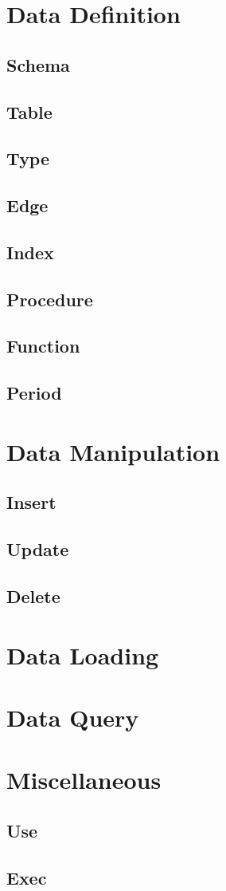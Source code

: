 \section{Data Definition}
\subsection{Schema}
\subsection{Table}
\subsection{Type}
\subsection{Edge}
\subsection{Index}
\subsection{Procedure}
\subsection{Function}
\subsection{Period}

\section{Data Manipulation}
\subsection{Insert}
\subsection{Update}
\subsection{Delete}

\section{Data Loading}

\section{Data Query}

\section{Miscellaneous}
\subsection{Use}
\subsection{Exec}
